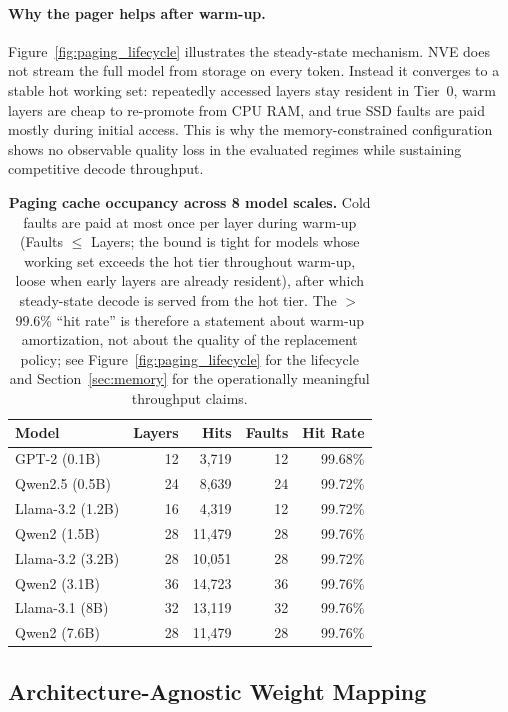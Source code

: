 \documentclass{article}
\begin{document}
\paragraph{Why the pager helps after warm-up.} Figure~\ref{fig:paging_lifecycle}
illustrates the steady-state mechanism. NVE does not stream the full model
from storage on every token. Instead it converges to a stable hot working set:
repeatedly accessed layers stay resident in Tier~0, warm layers are cheap to
re-promote from CPU RAM, and true SSD faults are paid mostly during initial
access. This is why the memory-constrained configuration shows no
observable quality loss in the evaluated regimes while sustaining
competitive decode throughput.

\begin{table}[H]
\centering
\caption{\textbf{Paging cache occupancy across 8 model scales.} Cold faults are paid
at most once per layer during warm-up (Faults $\leq$ Layers; the bound is tight for
models whose working set exceeds the hot tier throughout warm-up, loose when early
layers are already resident), after which steady-state decode is served from the hot tier. The $>$99.6\% ``hit rate'' is therefore a
statement about warm-up amortization, not about the quality of the replacement policy;
see Figure~\ref{fig:paging_lifecycle} for the lifecycle and Section~\ref{sec:memory} for the
operationally meaningful throughput claims.}
\label{tab:paging_stats}
\small
\begin{tabular}{lrrrr}
\toprule
Model & Layers & Hits & Faults & Hit Rate \\
\midrule
GPT-2 (0.1B) & 12 & 3,719 & 12 & 99.68\% \\
Qwen2.5 (0.5B) & 24 & 8,639 & 24 & 99.72\% \\
Llama-3.2 (1.2B) & 16 & 4,319 & 12 & 99.72\% \\
Qwen2 (1.5B) & 28 & 11,479 & 28 & 99.76\% \\
Llama-3.2 (3.2B) & 28 & 10,051 & 28 & 99.72\% \\
Qwen2 (3.1B) & 36 & 14,723 & 36 & 99.76\% \\
Llama-3.1 (8B) & 32 & 13,119 & 32 & 99.76\% \\
Qwen2 (7.6B) & 28 & 11,479 & 28 & 99.76\% \\
\bottomrule
\end{tabular}
\end{table}


\subsection{Architecture-Agnostic Weight Mapping}
\label{sec:arch}
\end{document}
